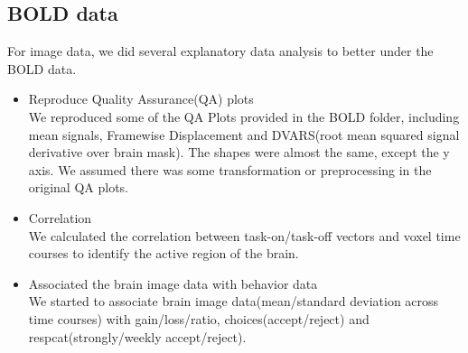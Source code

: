 \subsection{BOLD data}
For image data, we did several explanatory data analysis to better under the 
BOLD data. 
\begin{itemize}
\item Reproduce Quality Assurance(QA) plots\\
 We reproduced some of the QA Plots provided in the BOLD folder, including 
 mean signals, Framewise Displacement and DVARS(root mean squared signal 
 derivative over brain mask). The shapes were almost the same, except the y 
 axis. We assumed there was some transformation or preprocessing in the 
 original QA plots.
\item Correlation \\
 We calculated the correlation between task-on/task-off vectors and voxel time 
 courses to identify the active region of the brain. \\

\item Associated the brain image data with behavior data\\
We started to associate brain image data(mean/standard deviation across time courses) with gain/loss/ratio, choices(accept/reject) and respcat(strongly/weekly accept/reject).
\end {itemize}
